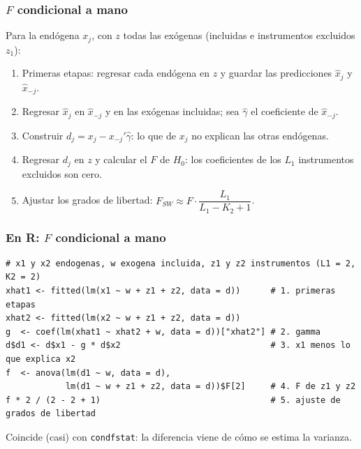 \documentclass[t, compress, spanish, aspectratio=169]{beamer}
\begin{document}
\begin{frame}
    \frametitle{$F$ condicional a mano}
    \small
    Para la end\'ogena $x_j$, con $z$ todas las ex\'ogenas (incluidas e instrumentos excluidos $z_1$):
    \begin{enumerate}
        \item <1-> Primeras etapas: regresar cada end\'ogena en $z$ y guardar las predicciones $\hat x_j$ y $\hat x_{-j}$.
        \item <2-> Regresar $\hat x_j$ en $\hat x_{-j}$ y en las ex\'ogenas incluidas; sea $\hat\gamma$ el coeficiente de $\hat x_{-j}$.
        \item <3-> Construir $d_j=x_j-x_{-j}'\hat\gamma$: lo que de $x_j$ no explican las otras end\'ogenas.
        \item <4-> Regresar $d_j$ en $z$ y calcular el $F$ de $H_0$: los coeficientes de los $L_1$ instrumentos excluidos son cero.
        \item <5-> Ajustar los grados de libertad: $F_{SW}\approx F\cdot\dfrac{L_1}{L_1-K_2+1}$.
    \end{enumerate}
\end{frame}
\begin{frame}[fragile]
    \frametitle{En R: $F$ condicional a mano}
\scriptsize
\begin{verbatim}
# x1 y x2 endogenas, w exogena incluida, z1 y z2 instrumentos (L1 = 2, K2 = 2)
xhat1 <- fitted(lm(x1 ~ w + z1 + z2, data = d))      # 1. primeras etapas
xhat2 <- fitted(lm(x2 ~ w + z1 + z2, data = d))
g  <- coef(lm(xhat1 ~ xhat2 + w, data = d))["xhat2"] # 2. gamma
d$d1 <- d$x1 - g * d$x2                              # 3. x1 menos lo que explica x2
f  <- anova(lm(d1 ~ w, data = d),
            lm(d1 ~ w + z1 + z2, data = d))$F[2]     # 4. F de z1 y z2
f * 2 / (2 - 2 + 1)                                  # 5. ajuste de grados de libertad
\end{verbatim}
    \normalsize
    Coincide (casi) con \texttt{condfstat}: la diferencia viene de c\'omo se estima la varianza.
\end{frame}
\end{document}
